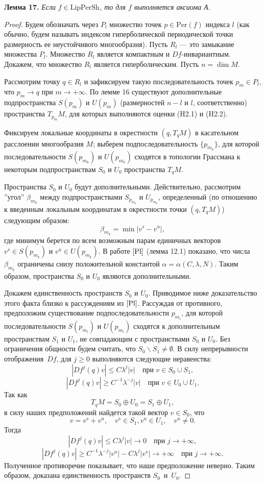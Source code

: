 \documentclass[12pt]{article}
\begin{document}
\textbf{Лемма 17.} \textit{Если} $f\in\mbox{LipPerSh}$\textit{, то для $f$ выполняется аксиома А.}

\begin{proof}
Будем обозначать через $P_l$ множество точек $p\in\mbox{Per}(f)$ индекса $l$ (как обычно, будем называть индексом гиперболической периодической точки размерность ее неустойчивого многообразия). Пусть $R_l$ --- это замыкание множества $P_l$. Множество $R_l$ является компактным и $Df$-инвариантным. Докажем, что множество $R_l$ является гиперболическим. Пусть $n=\dim M$.

Рассмотрим точку $q\in R_l$ и зафиксируем такую последовательность точек $p_m\in P_l$, что $p_m\longrightarrow q$ при $m\rightarrow+\infty$. По лемме 16 существуют дополнительные подпространства $S(p_m)$ и $U(p_m)$ (размерностей $n-l$ и $l$, соответственно) пространства $T_{p_m}M$, для которых выполняются оценки (H2.1) и (H2.2). 

Фиксируем локальные координаты в окрестности $(q,T_qM)$ в касательном расслоении многообразия $M$; выберем подпоследовательность $\{p_{m_k}\}$, для которой последовательности $S(p_{m_k})$ и $U(p_{m_k})$ сходятся в топологии Грассмана к некоторым подпространствам $S_0$ и $U_0$ пространства $T_qM$.

Пространства $S_0$ и $U_0$ будут дополнительными. Действительно, рассмотрим ''угол'' $\beta_{m_k}$ между подпространствами $S_{p_{m_k}}$ и $U_{p_{m_k}}$, определенный (по отношению к введенным локальным координатам в окрестности точки $(q,T_qM)$) следующим образом:
$$\beta_{m_k}=\min|v^s-v^u|,$$
где минимум берется по всем возможным парам единичных векторов $v^s\in S(p_{m_k})$ и $v^u\in U(p_{m_k})$.
В работе $\cite{Pl}$ (лемма 12.1) показано, что числа $\beta_{m_k}$ ограничены снизу положительной константой $\alpha=\alpha(C,\lambda,N)$. Таким образом, пространства $S_0$ и $U_0$ являются дополнительными.

Докажем единственность пространств $S_0$ и $U_0$. Приводимое ниже доказательство этого факта близко к рассуждениям из $\cite{Pl}$. Рассуждая от противного, предположим существование подпоследовательности $p_{m_i}$, для которой последовательности $S(p_{m_i})$ и $U(p_{m_i})$ сходятся к дополнительным пространствам $S_1$ и $U_1$, не совпадающим с пространствами $S_0$ и $U_0$. Без ограничения общности будем считать, что $S_0\backslash S_1\neq\emptyset$.
В силу непрерывности отображения~$Df$, для $j\geq0$ выполняются следующие неравенства: 
$$|Df^j(q)v|\leq C\lambda^j|v|\quad\textrm{при } v\in S_0\cup S_1,$$   
$$|Df^j(q)v|\geq C^{-1}\lambda^{-j}|v|\quad\textrm{при } v\in U_0\cup U_1.$$
Так как 
$$T_qM=S_0\oplus U_0=S_1\oplus U_1,$$
в силу наших предположений найдется такой вектор $v\in S_0$, что
$$v=v^s+v^u,\quad v^s\in S_1,v^u\in U_1,\quad v^u\neq0.$$
Тогда
$$|Df^j(q)v|\leq C\lambda^j|v|\longrightarrow0\quad\mbox{при }j\rightarrow+\infty,$$
$$|Df^j(q)v|\geq C^{-1}\lambda^{-j}|v^u|-C\lambda^j|v^s|\rightarrow+\infty\quad\mbox{при }j\rightarrow+\infty.$$
Полученное противоречие показывает, что наше предположение неверно. Таким образом, доказана единственность пространств $S_0$~и~$U_0$.


\end{proof}
\end{document}
